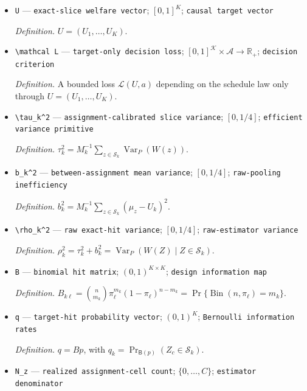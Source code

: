 \documentclass{article}
\begin{document}
\begin{itemize}
  \item \texttt{U} --- \texttt{exact-\allowbreak{}slice welfare vector}; \([0,1]^K\); \texttt{causal target vector}
  \par\smallskip\noindent\emph{Definition.} \(U=(U_1,\ldots,U_K)\).
  \item \texttt{\textbackslash{}\allowbreak{}mathcal L} --- \texttt{target-\allowbreak{}only decision loss}; \([0,1]^{\mathcal K}\times\mathcal A\to\mathbb R_+\); \texttt{decision criterion}
  \par\smallskip\noindent\emph{Definition.} A bounded loss \(\mathcal L(U,a)\) depending on the schedule law only through \(U=(U_1,\ldots,U_K)\).
  \item \texttt{\textbackslash{}\allowbreak{}tau\_\allowbreak{}k\textasciicircum{}2} --- \texttt{assignment-\allowbreak{}calibrated slice variance}; \([0,1/4]\); \texttt{efficient variance primitive}
  \par\smallskip\noindent\emph{Definition.} \(\tau_k^2=M_k^{-1}\sum_{z\in\mathcal S_k}\operatorname{Var}_P(W(z))\).
  \item \texttt{b\_\allowbreak{}k\textasciicircum{}2} --- \texttt{between-\allowbreak{}assignment mean variance}; \([0,1/4]\); \texttt{raw-\allowbreak{}pooling inefficiency}
  \par\smallskip\noindent\emph{Definition.} \(b_k^2=M_k^{-1}\sum_{z\in\mathcal S_k}(\mu_z-U_k)^2\).
  \item \texttt{\textbackslash{}\allowbreak{}rho\_\allowbreak{}k\textasciicircum{}2} --- \texttt{raw exact-\allowbreak{}hit variance}; \([0,1/4]\); \texttt{raw-\allowbreak{}estimator variance}
  \par\smallskip\noindent\emph{Definition.} \(\rho_k^2=\tau_k^2+b_k^2=\operatorname{Var}_P(W(Z)\mid Z\in\mathcal S_k)\).
  \item \texttt{B} --- \texttt{binomial hit matrix}; \((0,1)^{K\times K}\); \texttt{design information map}
  \par\smallskip\noindent\emph{Definition.} \(B_{k\ell}=\binom{n}{m_k}\pi_\ell^{m_k}(1-\pi_\ell)^{n-m_k}=\Pr\{\operatorname{Bin}(n,\pi_\ell)=m_k\}\).
  \item \texttt{q} --- \texttt{target-\allowbreak{}hit probability vector}; \((0,1)^K\); \texttt{Bernoulli information rates}
  \par\smallskip\noindent\emph{Definition.} \(q=Bp\), with \(q_k=\Pr_{\mathsf B(p)}(Z_c\in\mathcal S_k)\).
  \item \texttt{N\_\allowbreak{}z} --- \texttt{realized assignment-\allowbreak{}cell count}; \(\{0,\ldots,C\}\); \texttt{estimator denominator}

\end{itemize}
\end{document}
